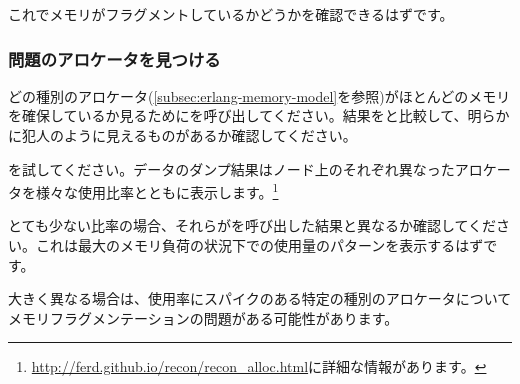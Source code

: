 これでメモリがフラグメントしているかどうかを確認できるはずです。

\subsubsection{問題のアロケータを見つける}

どの種別のアロケータ(\ref{subsec:erlang-memory-model}を参照)がほとんどのメモリを確保しているか見るためにを呼び出してください。結果をと比較して、明らかに犯人のように見えるものがあるか確認してください。

を試してください。データのダンプ結果はノード上のそれぞれ異なったアロケータを様々な使用比率とともに表示します。\footnote{\href{http://ferd.github.io/recon/recon\_alloc.html}{http://ferd.github.io/recon/recon\_alloc.html}に詳細な情報があります。}

とても少ない比率の場合、それらがを呼び出した結果と異なるか確認してください。これは最大のメモリ負荷の状況下での使用量のパターンを表示するはずです。

大きく異なる場合は、使用率にスパイクのある特定の種別のアロケータについてメモリフラグメンテーションの問題がある可能性があります。

